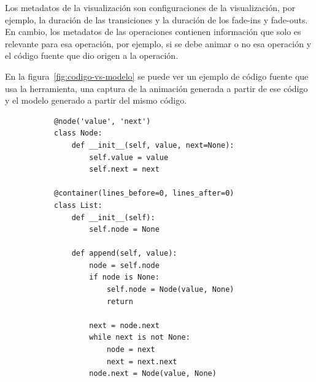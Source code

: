 Los metadatos de la visualización son configuraciones de la visualización, por ejemplo, la duración de las transiciones y la duración de los fade-ins y fade-outs. En cambio, los metadatos de las operaciones contienen información que solo es relevante para esa operación, por ejemplo, si se debe animar o no esa operación y el código fuente que dio origen a la operación.

En la figura~\ref{fig:codigo-vs-modelo} se puede ver un ejemplo de código fuente que usa la herramienta, una captura de la animación generada a partir de ese código y el modelo generado a partir del mismo código.

\begin{figure}[p]
    \centering
    \begin{subfigure}[b]{0.49\textwidth}
        \centering
        \begin{verbatim}
@node('value', 'next')
class Node:
    def __init__(self, value, next=None):
        self.value = value
        self.next = next

@container(lines_before=0, lines_after=0)
class List:
    def __init__(self):
        self.node = None
        
    def append(self, value):
        node = self.node
        if node is None:
            self.node = Node(value, None)
            return

        next = node.next
        while next is not None:
            node = next
            next = next.next
        node.next = Node(value, None)


\end{verbatim}
\end{subfigure}
\end{figure}
